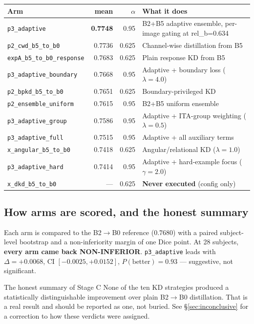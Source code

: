 \documentclass[11pt]{article}
\begin{document}
\begin{center}
\begin{tabular}{LnnW}
\toprule
\textbf{Arm} & \textbf{mean} & \textbf{$\alpha$} & \textbf{What it does} \\
\midrule
\texttt{p3\_adaptive} & \textbf{0.7748} & 0.95 & B2+B5 adaptive ensemble, per-image gating at rel\_b=0.634 \\
\texttt{p2\_cwd\_b5\_to\_b0} & 0.7736 & 0.625 & Channel-wise distillation from B5 \\
\texttt{expA\_b5\_to\_b0\_response} & 0.7683 & 0.625 & Plain response KD from B5 \\
\texttt{p3\_adaptive\_boundary} & 0.7668 & 0.95 & Adaptive + boundary loss ($\lambda=4.0$) \\
\texttt{p2\_bpkd\_b5\_to\_b0} & 0.7651 & 0.625 & Boundary-privileged KD \\
\texttt{p2\_ensemble\_uniform} & 0.7615 & 0.95 & B2+B5 uniform ensemble \\
\texttt{p3\_adaptive\_group} & 0.7586 & 0.95 & Adaptive + ITA-group weighting ($\lambda=0.5$) \\
\texttt{p3\_adaptive\_full} & 0.7515 & 0.95 & Adaptive + all auxiliary terms \\
\texttt{x\_angular\_b5\_to\_b0} & 0.7418 & 0.625 & Angular/relational KD ($\lambda=1.0$) \\
\texttt{p3\_adaptive\_hard} & 0.7414 & 0.95 & Adaptive + hard-example focus ($\gamma=2.0$) \\
\texttt{x\_dkd\_b5\_to\_b0} & --- & 0.625 & \textbf{Never executed} (config only) \\
\bottomrule
\end{tabular}
\end{center}

\subsection{How arms are scored, and the honest summary}

Each arm is compared to the B2$\rightarrow$B0 reference (0.7680) with a paired
subject-level bootstrap and a non-inferiority margin of one Dice point. At 28
subjects, \textbf{every arm came back NON-INFERIOR}. \texttt{p3\_adaptive} leads
with $\Delta=+0.0068$, CI $[-0.0025, +0.0152]$, $P(\text{better})=0.93$ ---
suggestive, not significant.

\begin{keybox}{The honest summary of Stage C}
None of the ten KD strategies produced a statistically distinguishable
improvement over plain B2$\rightarrow$B0 distillation. That is a real result and
should be reported as one, not buried. See \S\ref{sec:inconclusive} for a
correction to how these verdicts were assigned.
\end{keybox}
\end{document}
